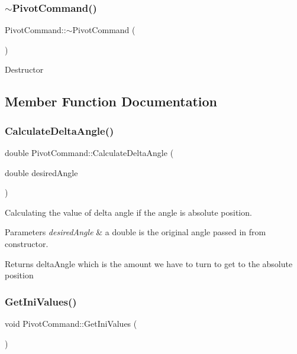 \subsubsection{\texorpdfstring{$\sim$\+Pivot\+Command()}{~PivotCommand()}}
{\footnotesize\ttfamily Pivot\+Command\+::$\sim$\+Pivot\+Command (\begin{DoxyParamCaption}{ }\end{DoxyParamCaption})\hspace{0.3cm}{\ttfamily [virtual]}}

Destructor 

\subsection{Member Function Documentation}
\mbox{\label{class_pivot_command_a56f0c011b2a744f1ed0a2b5cb301cdb2}} 
\subsubsection{\texorpdfstring{Calculate\+Delta\+Angle()}{CalculateDeltaAngle()}}
{\footnotesize\ttfamily double Pivot\+Command\+::\+Calculate\+Delta\+Angle (\begin{DoxyParamCaption}\item[{double}]{desired\+Angle }\end{DoxyParamCaption})\hspace{0.3cm}{\ttfamily [private]}}

Calculating the value of delta angle if the angle is absolute position. 
\begin{DoxyParams}{Parameters}
{\em desired\+Angle} & a double is the original angle passed in from constructor. \\
\hline
\end{DoxyParams}
\begin{DoxyReturn}{Returns}
delta\+Angle which is the amount we have to turn to get to the absolute position 
\end{DoxyReturn}
\mbox{\label{class_pivot_command_add10aedba04f38b03753ac09fc1d4faf}} 
\subsubsection{\texorpdfstring{Get\+Ini\+Values()}{GetIniValues()}}
{\footnotesize\ttfamily void Pivot\+Command\+::\+Get\+Ini\+Values (\begin{DoxyParamCaption}{ }\end{DoxyParamCaption})}

